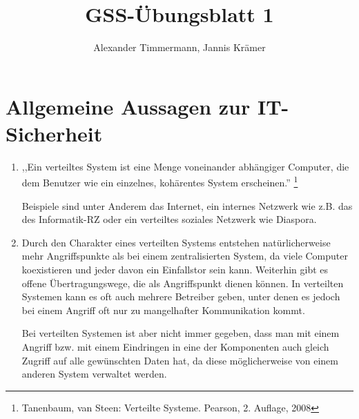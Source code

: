 \documentclass[a4paper,11pt]{scrartcl}
\author{Alexander Timmermann, Jannis Krämer}
\title{GSS-Übungsblatt 1}
\date{}
\begin{document}
\maketitle
\thispagestyle{empty}

\section{Allgemeine Aussagen zur IT-Sicherheit}

\begin{enumerate}[1.]
    \item
        \begin{displayquote}
            ,,Ein verteiltes System ist eine Menge voneinander abhängiger Computer,
            die dem Benutzer wie ein einzelnes, kohärentes System erscheinen.''%
            \footnote{Tanenbaum, van Steen: Verteilte Systeme. Pearson, 2. Auflage, 2008}
        \end{displayquote}

        Beispiele sind unter Anderem das Internet, ein internes Netzwerk wie z.B.
        das des Informatik-RZ oder ein verteiltes soziales Netzwerk wie Diaspora.

    \item Durch den Charakter eines verteilten Systems entstehen natürlicherweise
          mehr Angriffspunkte als bei einem zentralisierten System, da viele Computer
          koexistieren und jeder davon ein Einfallstor sein kann. Weiterhin gibt
          es offene Übertragungswege, die als Angriffspunkt dienen können.
          In verteilten Systemen kann es oft auch mehrere Betreiber geben, unter
          denen es jedoch bei einem Angriff oft nur zu mangelhafter Kommunikation
          kommt.

          Bei verteilten Systemen ist aber nicht immer gegeben, dass man mit einem
          Angriff bzw. mit einem Eindringen in eine der Komponenten auch gleich
          Zugriff auf alle gewünschten Daten hat, da diese möglicherweise von
          einem anderen System verwaltet werden.


\end{enumerate}
\end{document}
